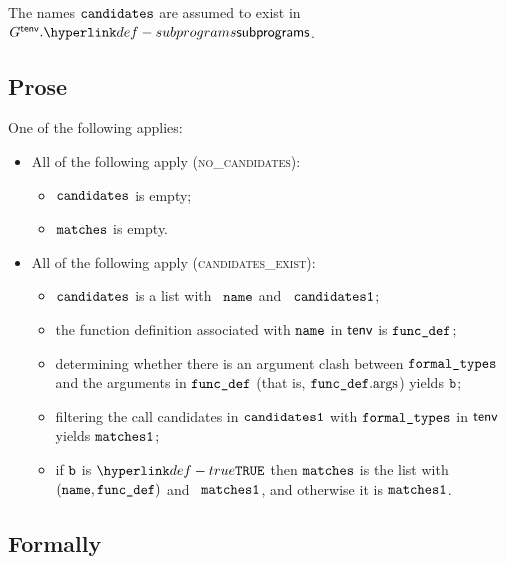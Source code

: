 The names $\texttt{candidates}$ are assumed to exist in $G^\tenv.\subprograms$.

\subsection{Prose}
One of the following applies:
\begin{itemize}
  \item All of the following apply (\textsc{no\_candidates}):
  \begin{itemize}
    \item $\texttt{candidates}$ is empty;
    \item $\texttt{matches}$ is empty.
  \end{itemize}

  \item All of the following apply (\textsc{candidates\_exist}):
  \begin{itemize}
    \item $\texttt{candidates}$ is a list with \head\ $\texttt{name}$ and \tail\ $\texttt{candidates1}$;
    \item the function definition associated with $\texttt{name}$ in $\textsf{tenv}$ is $\texttt{func\_def}$;
    \item determining whether there is an argument clash between $\texttt{formal\_types}$ and the arguments in $\texttt{func\_def}$
          (that is, $\texttt{func\_def}.\text{args}$) yields $\texttt{b}$\ProseOrTypeError;
    \item filtering the call candidates in $\texttt{candidates1}$ with $\texttt{formal\_types}$ in $\textsf{tenv}$ yields $\texttt{matches1}$\ProseOrTypeError;
    \item if $\texttt{b}$ is $\True$ then $\texttt{matches}$ is the list with \head\ $(\texttt{name},\texttt{func\_def})$ and \tail\ $\texttt{matches1}$,
          and otherwise it is $\texttt{matches1}$.
  \end{itemize}
\end{itemize}

\subsection{Formally}

